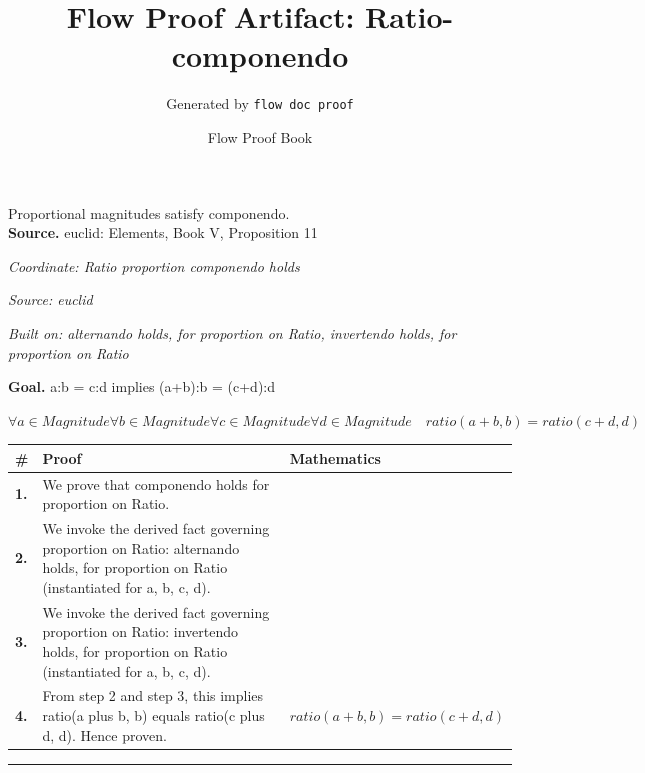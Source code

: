 \documentclass[11pt]{article}
\title{Flow Proof Artifact: Ratio-componendo}
\author{Generated by \texttt{flow doc proof}}
\date{Flow Proof Book}
\theoremstyle{definition}
\begin{document}
\maketitle
Proportional magnitudes satisfy componendo.\\[0.5em]
\textbf{Source.} euclid: Elements, Book V, Proposition 11\\[0.5em]
\bigskip
{}\par
\smallskip\noindent\textit{Coordinate: Ratio \cdot proportion \cdot componendo holds}\par
\smallskip\noindent\textit{Source: euclid}\par
\smallskip\noindent\textit{Built on: alternando holds, for proportion on Ratio, invertendo holds, for proportion on Ratio}\par
\medskip
\noindent\textbf{Goal.} a:b = c:d implies (a+b):b = (c+d):d\par
\noindent$\displaystyle \forall a \in Magnitude \forall b \in Magnitude \forall c \in Magnitude \forall d \in Magnitude\quad ratio(a + b, b) = ratio(c + d, d)$\par
\medskip
\noindent
\begin{tabular}{@{} >{\raggedright\arraybackslash}p{} >{\raggedright\arraybackslash}p{} >{\raggedleft\arraybackslash}p{} @{}}
\textbf{\#} & \textbf{Proof} & \textbf{Mathematics} \\
\midrule
\textbf{1.} & We prove that componendo holds for proportion on Ratio. & \\[0.45em]
\textbf{2.} & We invoke the derived fact governing proportion on Ratio: alternando holds, for proportion on Ratio (instantiated for a, b, c, d). & \\[0.45em]
\textbf{3.} & We invoke the derived fact governing proportion on Ratio: invertendo holds, for proportion on Ratio (instantiated for a, b, c, d). & \\[0.45em]
\textbf{4.} & From step 2 and step 3, this implies ratio(a plus b, b) equals ratio(c plus d, d). Hence proven. & $\displaystyle ratio(a + b, b) = ratio(c + d, d)$ \\[0.45em]
\bottomrule
\end{tabular}
\label{thm:Ratio-proportion-componendo_holds}
\par\medskip\hrule
\end{document}
